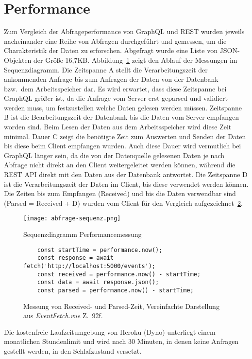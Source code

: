 \section{Performance}
Zum Vergleich der Abfrageperformance von GraphQL und REST wurden jeweils nacheinander eine Reihe von Abfragen durchgeführt und gemessen, um die Charakteristik der Daten zu erforschen.
Abgefragt wurde eine Liste von JSON-Objekten der Größe 16,7KB.
Abbildung~\ref{img:abfrage-sequenz} zeigt den Ablauf der Messungen im Sequenzdiagramm.
Die Zeitspanne A stellt die Verarbeitungszeit der ankommenden Anfrage bis zum Anfragen der Daten von der Datenbank bzw.\ dem Arbeitsspeicher dar.
Es wird erwartet, dass diese Zeitspanne bei GraphQL größer ist, da die Anfrage vom Server erst geparsed und validiert werden muss, um festzustellen welche Daten gelesen werden müssen.
Zeitspanne B ist die Bearbeitungszeit der Datenbank bis die Daten vom Server empfangen worden sind.
Beim Lesen der Daten aus dem Arbeitsspeicher wird diese Zeit minimal.
Dauer C zeigt die benötigte Zeit zum Auswerten und Senden der Daten bis diese beim Client empfangen wurden.
Auch diese Dauer wird vermutlich bei GraphQL länger sein, da die von der Datenquelle gelesenen Daten je nach Abfrage nicht direkt an den Client weitergeleitet werden können, während die REST API direkt mit den Daten aus der Datenbank antwortet.
Die Zeitspanne D ist die Verarbeitungszeit der Daten im Client, bis diese verwendet werden können.
Die Zeiten bis zum Empfangen (Received) und bis die Daten verwendbar sind (Parsed = Received + D) wurden vom Client für den Vergleich aufgezeichnet~\ref{code:measuring}.
\begin{figure}[h]
  \centering
  \texttt{[image: abfrage-sequenz.png]}
  \caption{Sequenzdiagramm Performancemessung}\label{img:abfrage-sequenz}
\end{figure}
\begin{figure}[h]
  \centering
  \begin{verbatim}
    const startTime = performance.now();
    const response = await fetch('http://localhost:5000/events');
    const received = performance.now() - startTime;
    const data = await response.json();
    const parsed = performance.now() - startTime;
  \end{verbatim}
  \caption{Messung von Received- und Parsed-Zeit, Vereinfachte Darstellung aus \emph{EventFetch.vue} Z.~92f.}\label{code:measuring}
\end{figure}
\par
Die kostenfreie Laufzeitumgebung von Heroku (Dyno) unterliegt einem monatlichen Stundenlimit und wird nach 30 Minuten, in denen keine Anfragen gestellt werden, in den Schlafzustand versetzt.

